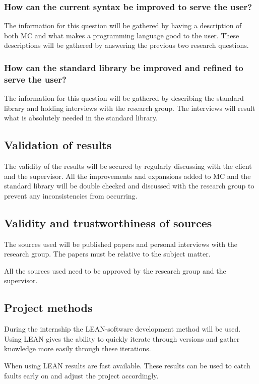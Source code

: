 \subsubsection{How can the current syntax be improved to serve the user?}
The information for this question will be gathered by having a description of both MC and what makes a programming language good to the user.
These descriptions will be gathered by answering the previous two research questions.

\subsubsection{How can the standard library be improved and refined to serve the user?}
The information for this question will be gathered by describing the standard library and holding interviews with the research group.
The interviews will result what is absolutely needed in the standard library.


\subsection{Validation of results}
The validity of the results will be secured by regularly discussing with the client and the supervisor.
All the improvements and expansions added to MC and the standard library will be double checked and discussed with the research group to prevent any inconsistencies from occurring.


\subsection{Validity and trustworthiness of sources}
The sources used will be published papers and personal interviews with the research group.
The papers must be relative to the subject matter.

All the sources used need to be approved by the research group and the supervisor.


\subsection{Project methods}
During the internship the LEAN-software development method will be used\cite{ries2011lean}.
Using LEAN gives the ability to quickly iterate through versions and gather knowledge more easily through these iterations.

When using LEAN results are fast available.
These results can be used to catch faults early on and adjust the project accordingly.


